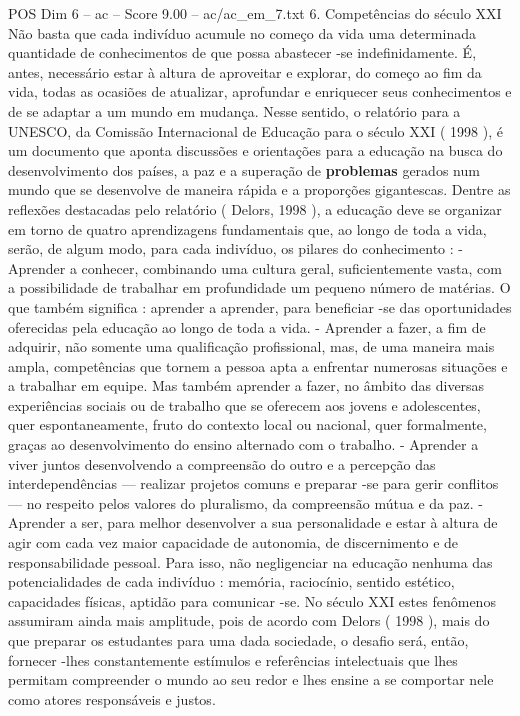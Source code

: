 \begin{textsample}{POS Dim 6 – ac – Score 9.00 – ac/ac\_em\_7.txt}  \label{ex:f6_pos_154}
6.
Competências do século XXI Não basta que cada indivíduo acumule no começo da vida uma determinada quantidade de conhecimentos de que possa abastecer -se indefinidamente.
É, antes, necessário estar à altura de aproveitar e explorar, do começo ao fim da vida, todas as ocasiões de atualizar, aprofundar e enriquecer seus conhecimentos e de se adaptar a um mundo em mudança.
Nesse sentido, o relatório para a UNESCO, da Comissão Internacional de Educação para o século XXI ( 1998 ), é um documento que aponta discussões e orientações para a educação na busca do desenvolvimento dos países, a paz e a superação de \textbf{problemas} gerados num mundo que se desenvolve de maneira rápida e a proporções gigantescas.
Dentre as reflexões destacadas pelo relatório ( Delors, 1998 ), a educação deve se organizar em torno de quatro aprendizagens fundamentais que, ao longo de toda a vida, serão, de algum modo, para cada indivíduo, os pilares do conhecimento : - Aprender a conhecer, combinando uma cultura geral, suficientemente vasta, com a possibilidade de trabalhar em profundidade um pequeno número de matérias.
O que também significa : aprender a aprender, para beneficiar -se das oportunidades oferecidas pela educação ao longo de toda a vida. - Aprender a fazer, a fim de adquirir, não somente uma qualificação profissional, mas, de uma maneira mais ampla, competências que tornem a pessoa apta a enfrentar numerosas situações e a trabalhar em equipe.
Mas também aprender a fazer, no âmbito das diversas experiências sociais ou de trabalho que se oferecem aos jovens e adolescentes, quer espontaneamente, fruto do contexto local ou nacional, quer formalmente, graças ao desenvolvimento do ensino alternado com o trabalho. - Aprender a viver juntos desenvolvendo a compreensão do outro e a percepção das interdependências — realizar projetos comuns e preparar -se para gerir conflitos — no respeito pelos valores do pluralismo, da compreensão mútua e da paz. - Aprender a ser, para melhor desenvolver a sua personalidade e estar à altura de agir com cada vez maior capacidade de autonomia, de discernimento e de responsabilidade pessoal.
Para isso, não negligenciar na educação nenhuma das potencialidades de cada indivíduo : memória, raciocínio, sentido estético, capacidades físicas, aptidão para comunicar -se.
No século XXI estes fenômenos assumiram ainda mais amplitude, pois de acordo com Delors ( 1998 ), mais do que preparar os estudantes para uma dada sociedade, o desafio será, então, fornecer -lhes constantemente estímulos e referências intelectuais que lhes permitam compreender o mundo ao seu redor e lhes ensine a se comportar nele como atores responsáveis e justos.

\end{textsample}
